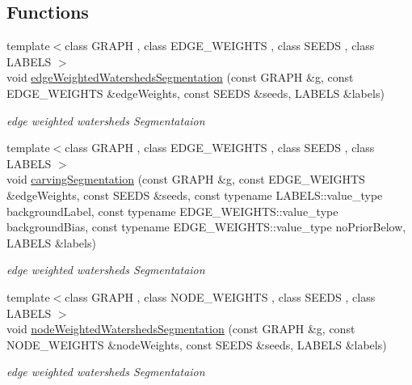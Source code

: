 \subsection*{Functions}
\begin{DoxyCompactItemize}
\item 
{\footnotesize template$<$class G\+R\+A\+P\+H , class E\+D\+G\+E\+\_\+\+W\+E\+I\+G\+H\+T\+S , class S\+E\+E\+D\+S , class L\+A\+B\+E\+L\+S $>$ }\\void \hyperlink{namespacenifty_1_1graph_a3e294171c18ca5e524f85c9341ef2f5e}{edge\+Weighted\+Watersheds\+Segmentation} (const G\+R\+A\+P\+H \&g, const E\+D\+G\+E\+\_\+\+W\+E\+I\+G\+H\+T\+S \&edge\+Weights, const S\+E\+E\+D\+S \&seeds, L\+A\+B\+E\+L\+S \&labels)
\begin{DoxyCompactList}\small\item\em edge weighted watersheds Segmentataion \end{DoxyCompactList}\item 
{\footnotesize template$<$class G\+R\+A\+P\+H , class E\+D\+G\+E\+\_\+\+W\+E\+I\+G\+H\+T\+S , class S\+E\+E\+D\+S , class L\+A\+B\+E\+L\+S $>$ }\\void \hyperlink{namespacenifty_1_1graph_a428250605a1a1f6fc93fd6aac965b931}{carving\+Segmentation} (const G\+R\+A\+P\+H \&g, const E\+D\+G\+E\+\_\+\+W\+E\+I\+G\+H\+T\+S \&edge\+Weights, const S\+E\+E\+D\+S \&seeds, const typename L\+A\+B\+E\+L\+S\+::value\+\_\+type background\+Label, const typename E\+D\+G\+E\+\_\+\+W\+E\+I\+G\+H\+T\+S\+::value\+\_\+type background\+Bias, const typename E\+D\+G\+E\+\_\+\+W\+E\+I\+G\+H\+T\+S\+::value\+\_\+type no\+Prior\+Below, L\+A\+B\+E\+L\+S \&labels)
\begin{DoxyCompactList}\small\item\em edge weighted watersheds Segmentataion \end{DoxyCompactList}\item 
{\footnotesize template$<$class G\+R\+A\+P\+H , class N\+O\+D\+E\+\_\+\+W\+E\+I\+G\+H\+T\+S , class S\+E\+E\+D\+S , class L\+A\+B\+E\+L\+S $>$ }\\void \hyperlink{namespacenifty_1_1graph_a5f2f2483c8ff3c80f1597b4d206a65b2}{node\+Weighted\+Watersheds\+Segmentation} (const G\+R\+A\+P\+H \&g, const N\+O\+D\+E\+\_\+\+W\+E\+I\+G\+H\+T\+S \&node\+Weights, const S\+E\+E\+D\+S \&seeds, L\+A\+B\+E\+L\+S \&labels)
\begin{DoxyCompactList}\small\item\em edge weighted watersheds Segmentataion \end{DoxyCompactList}\item 

\end{DoxyCompactItemize}
